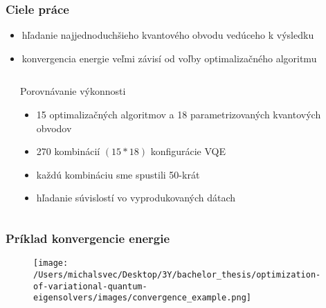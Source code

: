 \documentclass{beamer}
\begin{document}
\begin{frame}
	\frametitle{Ciele práce}
	\begin{itemize}
		\item hľadanie najjednoduchšieho kvantového obvodu vedúceho k výsledku
        \item konvergencia energie veľmi závisí od voľby optimalizačného algoritmu
	\end{itemize}
    \begin{columns}[T] %
        \begin{column}{0.05\textwidth} %
        \end{column}
        \begin{column}{0.9\textwidth} %
            \begin{block}{Porovnávanie výkonnosti}
                \begin{itemize}
                    \item 15 optimalizačných algoritmov a 18 parametrizovaných kvantových obvodov
                    \item 270 kombinácií $(15 * 18)$ konfigurácie VQE
                    \item každú kombináciu sme spustili 50-krát
                    \item hľadanie súvislostí vo vyprodukovaných dátach
                \end{itemize}
            \end{block}
        \end{column}
        \begin{column}{0.05\textwidth} %
        \end{column}
    \end{columns}
   
	
\end{frame}

\begin{frame}
	\frametitle{Príklad konvergencie energie}
    \begin{figure}[H]
        \centering
        \texttt{[image: /Users/michalsvec/Desktop/3Y/bachelor\_thesis/optimization-of-variational-quantum-eigensolvers/images/convergence\_example.png]}
    \end{figure}
\end{frame}
\end{document}
